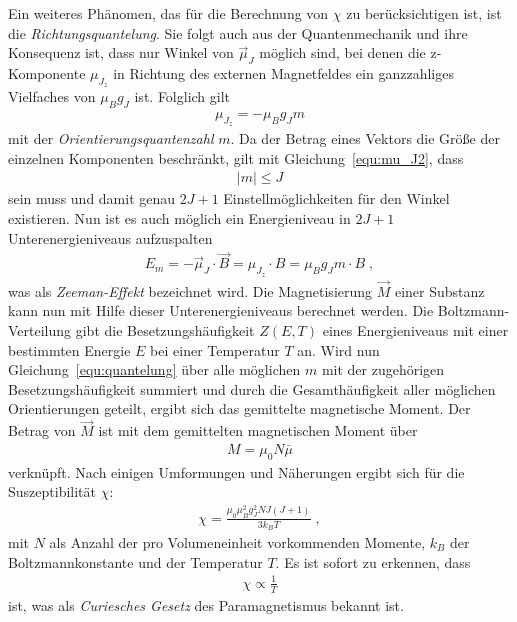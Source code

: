 Ein weiteres Phänomen, das für die Berechnung von $\chi$ zu berücksichtigen ist, ist die \emph{Richtungsquantelung}. Sie folgt auch aus der Quantenmechanik und ihre Konsequenz ist, dass nur Winkel von $\vec\mu_J$ möglich sind, bei denen die z-Komponente $\mu_{J_z}$ in Richtung des externen Magnetfeldes ein ganzzahliges Vielfaches von $\mu_B g_J$ ist. Folglich gilt
\begin{align}
  \label{equ:quantelung}
  \mu_{J_z} = -\mu_B g_J m
\end{align}
mit der \emph{Orientierungsquantenzahl} $m$. Da der Betrag eines Vektors die Größe der einzelnen Komponenten beschränkt, gilt mit Gleichung~\eqref{equ:mu_J2}, dass
\begin{align*}
  |m| \leq J
\end{align*}
sein muss und damit genau $2J+1$ Einstellmöglichkeiten für den Winkel existieren. Nun ist es auch möglich ein Energieniveau in $2J+1$ Unterenergieniveaus aufzuspalten
\begin{align}
  \label{equ:Zeemann}
  E_m = -\vec \mu_J \cdot \vec B = \mu_{J_z}\cdot B = \mu_B g_J m \cdot B \; ,
\end{align}
was als \emph{Zeeman-Effekt} bezeichnet wird.
Die Magnetisierung $\vec M$ einer Substanz kann nun mit Hilfe dieser Unterenergieniveaus berechnet werden. Die Boltzmann-Verteilung gibt die Besetzungshäufigkeit $Z(E,T)$ eines Energieniveaus mit einer bestimmten Energie $E$ bei einer Temperatur $T$ an. Wird nun Gleichung~\eqref{equ:quantelung} über alle möglichen $m$ mit der zugehörigen Besetzungshäufigkeit summiert und durch die Gesamthäufigkeit aller möglichen Orientierungen geteilt, ergibt sich das gemittelte magnetische Moment. Der Betrag von $\vec M$ ist mit dem gemittelten magnetischen Moment über
\begin{align}
  M = \mu_0 N \bar \mu
\end{align}
verknüpft. Nach einigen Umformungen und Näherungen ergibt sich für die Suszeptibilität $\chi$:
\begin{align}
  \label{equ:sub_calc}
  \chi = \frac{\mu_0 \mu_B^2 g_J^2 N J(J+1)}{3k_B T} \; ,
\end{align}
mit $N$ als Anzahl der pro Volumeneinheit vorkommenden Momente, $k_B$ der Boltzmannkonstante und der Temperatur $T$. Es ist sofort zu erkennen, dass
\begin{align}
  \chi \propto \frac{1}{T}
\end{align}
ist, was als \emph{Curiesches Gesetz} des Paramagnetismus bekannt ist.\newpage

